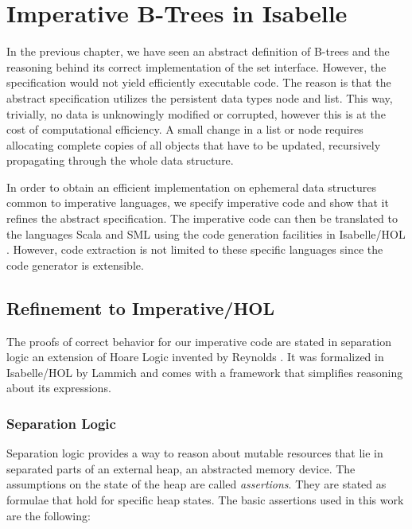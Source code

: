 
\chapter{Imperative B-Trees in Isabelle}\label{chapter:imp-set}

In the previous chapter, we have seen
an abstract definition of B-trees and the reasoning
behind its correct implementation of the set interface.
However, the specification would not yield 
efficiently executable code.
The reason is that the abstract specification utilizes
the persistent data types node and list.
This way, trivially, no data is unknowingly
modified or corrupted,
however this is at the cost of computational efficiency.
A small change in a list or node
requires allocating complete copies of all objects that have to be updated,
recursively propagating through the whole data structure.

In order to obtain an efficient implementation
on ephemeral data structures common to imperative languages,
we specify imperative code and show that
it refines the abstract specification.
The imperative code can then be translated to
the languages Scala \parencite{OderskyScala} and SML \parencite{DBLP:books/daglib/0069232}
using the code generation
facilities in Isabelle/HOL \parencite{Haftmann20codegeneration}.
However, code extraction is not limited
to these specific languages
since the code generator is extensible.

\section{Refinement to Imperative/HOL}

The proofs of correct behavior for our imperative
code are stated in separation logic
an extension of Hoare Logic invented by Reynolds \parencite{DBLP:conf/lics/Reynolds02}.
It was formalized in Isabelle/HOL by Lammich \parencite{DBLP:journals/jar/Lammich19}
and comes with a framework that simplifies reasoning about
its expressions.

\subsection{Separation Logic}

Separation logic provides a way to reason about mutable resources
that lie in separated parts of an external heap,
an abstracted memory device.
The assumptions on the state of the heap are called \textit{assertions}.
They are stated as formulae that hold for specific heap states.
The basic assertions used in this work are the following:

